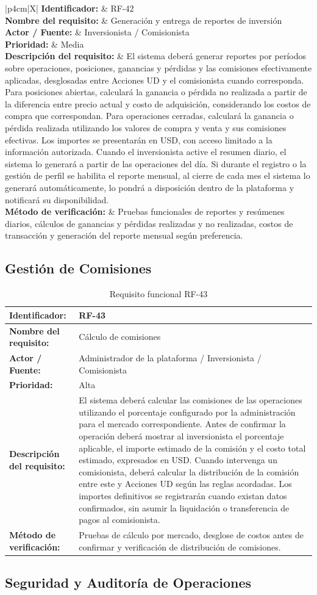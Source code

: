 \documentclass[11pt,a4paper,oneside]{article}
\newcommand{\tablaRequisito}[6]{%
\begin{table}[H]
\centering
\begin{tabularx}{\linewidth}{|p{4cm}|X|}
\hline
\textbf{Identificador:} & #1 \\ \hline
\textbf{Nombre del requisito:} & #2 \\ \hline
\textbf{Actor / Fuente:} & #3 \\ \hline
\textbf{Prioridad:} & #4 \\ \hline
\textbf{Descripción del requisito:} &
#5 \\ \hline
\textbf{Método de verificación:} & #6 \\ \hline
\end{tabularx}
\caption{Requisito funcional #1}
\label{tab:#1}
\end{table}
}
\begin{document}
\tablaRequisito
{RF-42}
{Generación y entrega de reportes de inversión}
{Inversionista / Comisionista}
{Media}
{El sistema deberá generar reportes por períodos sobre operaciones, posiciones, ganancias y pérdidas y las comisiones efectivamente aplicadas, desglosadas entre Acciones UD y el comisionista cuando corresponda. Para posiciones abiertas, calculará la ganancia o pérdida no realizada a partir de la diferencia entre precio actual y costo de adquisición, considerando los costos de compra que correspondan. Para operaciones cerradas, calculará la ganancia o pérdida realizada utilizando los valores de compra y venta y sus comisiones efectivas. Los importes se presentarán en USD, con acceso limitado a la información autorizada. Cuando el inversionista active el resumen diario, el sistema lo generará a partir de las operaciones del día. Si durante el registro o la gestión de perfil se habilita el reporte mensual, al cierre de cada mes el sistema lo generará automáticamente, lo pondrá a disposición dentro de la plataforma y notificará su disponibilidad.}
{Pruebas funcionales de reportes y resúmenes diarios, cálculos de ganancias y pérdidas realizadas y no realizadas, costos de transacción y generación del reporte mensual según preferencia.}


\subsection{Gestión de Comisiones}

\tablaRequisito
{RF-43}
{Cálculo de comisiones}
{Administrador de la plataforma / Inversionista / Comisionista}
{Alta}
{El sistema deberá calcular las comisiones de las operaciones utilizando el porcentaje configurado por la administración para el mercado correspondiente. Antes de confirmar la operación deberá mostrar al inversionista el porcentaje aplicable, el importe estimado de la comisión y el costo total estimado, expresados en USD. Cuando intervenga un comisionista, deberá calcular la distribución de la comisión entre este y Acciones UD según las reglas acordadas. Los importes definitivos se registrarán cuando existan datos confirmados, sin asumir la liquidación o transferencia de pagos al comisionista.}
{Pruebas de cálculo por mercado, desglose de costos antes de confirmar y verificación de distribución de comisiones.}


\subsection{Seguridad y Auditoría de Operaciones}
\end{document}
